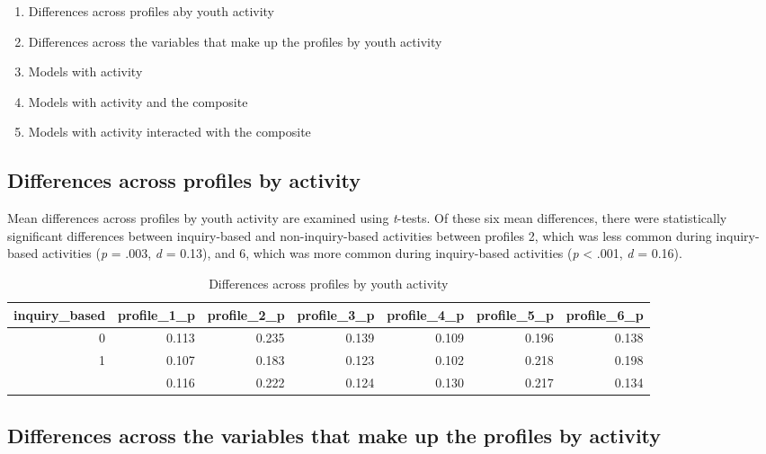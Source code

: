 \documentclass[]{book}
\providecommand{\tightlist}{%
  \setlength{\itemsep}{0pt}\setlength{\parskip}{0pt}}
\theoremstyle{definition}
\theoremstyle{definition}
\theoremstyle{definition}
\theoremstyle{remark}
\begin{document}
\begin{enumerate}
\def\labelenumi{\arabic{enumi}.}
\tightlist
\item
  Differences across profiles aby youth activity
\item
  Differences across the variables that make up the profiles by youth
  activity
\item
  Models with activity
\item
  Models with activity and the composite
\item
  Models with activity interacted with the composite
\end{enumerate}

\subsection{Differences across profiles by
activity}\label{differences-across-profiles-by-activity}

Mean differences across profiles by youth activity are examined using
\emph{t}-tests. Of these six mean differences, there were statistically
significant differences between inquiry-based and non-inquiry-based
activities between profiles 2, which was less common during
inquiry-based activities (\emph{p} = .003, \emph{d} = 0.13), and 6,
which was more common during inquiry-based activities (\emph{p}
\textless{} .001, \emph{d} = 0.16).

\begin{table}

\caption{\label{tab:rq3-1-diff-by-profiles}Differences across profiles by youth activity}
\centering
\begin{tabular}[t]{rrrrrrr}
\toprule
inquiry\_based & profile\_1\_p & profile\_2\_p & profile\_3\_p & profile\_4\_p & profile\_5\_p & profile\_6\_p\\
\midrule
0 & 0.113 & 0.235 & 0.139 & 0.109 & 0.196 & 0.138\\
1 & 0.107 & 0.183 & 0.123 & 0.102 & 0.218 & 0.198\\
 & 0.116 & 0.222 & 0.124 & 0.130 & 0.217 & 0.134\\
\bottomrule
\end{tabular}
\end{table}

\subsection{Differences across the variables that make up the profiles
by
activity}\label{differences-across-the-variables-that-make-up-the-profiles-by-activity}
\end{document}
